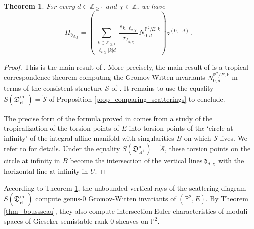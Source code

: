 \documentclass[11pt,letterpaper]{amsart}
\newtheorem{defn}{Definition}[section]
\newtheorem{thm}[defn]{Theorem}
\newcommand\PP{\mathbb P}
\newcommand\Z{\mathbb Z}
\newcommand\fd{\mathfrak d}
\newcommand\fD{\mathfrak D}
\newcommand\cl{\operatorname{cl}}
\newcommand\iin{\mathrm{in}}
\begin{document}


\begin{thm}\label{thm_gabele}
For every 
$d \in \Z_{\geqslant 1}$ and $\chi \in \Z$, we have 
\[ H_{\fd_{d,\chi}}
=\left( \sum_{\substack{k \in \Z_{\geqslant 1} \\ \ell_{d,\chi}|k|d}}
\frac{s_{k,\ell_{d,\chi}}}{r_{\ell_{d,\chi}}} N_{0,d}^{\PP^2/E,k}
\right)
z^{(0,-d)} \,.\]
\end{thm}

\begin{proof}
This is the main result of 
\cite{gabele2019tropical}.
More precisely, the main result of 
\cite{gabele2019tropical} is a tropical correspondence theorem computing the Gromov-Witten invariants $N_{0,d}^{\PP^2/E,k}$ in terms of the consistent structure 
$\mathcal{S}$ of
\cite[Example 2.4]{cps}. It remains to use the equality 
$S(\fD^\iin_{\cl^+})=\tilde{\mathcal{S}}$ of 
Proposition \ref{prop_comparing_scatterings}
to conclude.

The precise form of the formula proved in 
\cite{gabele2019tropical} comes from a study of the tropicalization of the torsion points of $E$ into torsion points of the 
`circle at infinity' of the integral affine manifold with singularities $B$ on which $\mathcal{S}$ lives. We refer to \cite[\S 6]{gabele2019tropical} for details. 
Under the equality $S(\fD^\iin_{\cl^+})=\tilde{\mathcal{S}}$, these torsion points on the circle at infinity in $B$ become the intersection of the vertical lines $\fd_{d,\chi}$ with the horizontal line at infinity in $U$. 
\end{proof}

According to Theorem \ref{thm_gabele}, the unbounded vertical rays of the scattering diagram $S(\fD^\iin_{\cl^+})$ compute genus-$0$ Gromov-Witten invariants of $(\PP^2,E)$. 
By Theorem \ref{thm_boussseau}, they also compute intersection Euler characteristics of moduli spaces of Gieseker semistable rank $0$ sheaves on $\PP^2$.
\end{document}
